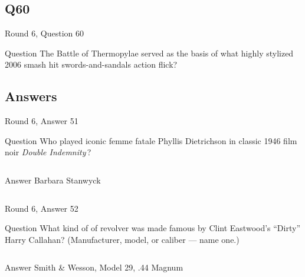 \documentclass[11pt]{beamer}
\begin{document}
\subsection*{Q60}
\begin{frame}[t]{Round 6, Question 60}
\vspace{2em}
\begin{block}{Question}
The Battle of Thermopylae served as the basis of what highly stylized 2006 smash hit swords-and-sandals action flick?
\end{block}
\end{frame}
    
\subsection{Answers}

\begin{frame}[t]{Round 6, Answer 51}
\vspace{2em}
\begin{block}{Question}
Who played iconic femme fatale Phyllis Dietrichson in classic 1946 film noir \emph{Double Indemnity}\,?
\end{block}
\pause{}
\begin{columns}[T,totalwidth=\linewidth]
\begin{column}{0.35\linewidth}
\begin{block}{Answer}
Barbara Stanwyck
\end{block}
\end{column}
\begin{column}{0.6\linewidth}
\begin{center}
\texttt{[image: \{Images/stanwyck\_doubleindemnity]}.png}
\end{center}
\end{column}
\end{columns}
\end{frame}
    

\begin{frame}[t]{Round 6, Answer 52}
\vspace{2em}
\begin{block}{Question}
What kind of of revolver was made famous by Clint Eastwood's ``Dirty'' Harry Callahan? (Manufacturer, model, or caliber — name one.)
\end{block}
\pause{}
\begin{columns}[T,totalwidth=\linewidth]
\begin{column}{0.35\linewidth}
\begin{block}{Answer}
Smith \& Wesson, Model 29, .44 Magnum
\end{block}
\end{column}
\begin{column}{0.6\linewidth}
\begin{center}
\texttt{[image: \{Images/dirtyharry]}.jpg}
\end{center}
\end{column}
\end{columns}
\end{frame}
    
\end{document}
